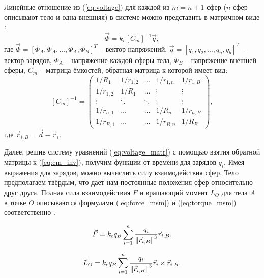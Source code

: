 Линейные отношение из (\ref{eq:voltage}) для каждой из $m = n + 1$ сфер ($n$ сфер описывают тело и одна внешняя) в системе можно представить в матричном виде \cite{msm}:
\begin{equation}
\label{eq:voltage_matr}
	\vec{\Phi} = k_c [C_m]^{-1} \vec{q},
\end{equation}
где $\vec{\Phi} = [\Phi_A, \Phi_A, \dots, \Phi_A, \Phi_B]^T$ – вектор напряжений, $\vec{q} = [q_1, q_2, \dots, q_n, q_b]^T$ – вектор зарядов, $\Phi_A$ – напряжение каждой сферы тела, $\Phi_B$ – напряжение внешней сферы, $C_m$ – матрица ёмкостей, обратная матрица к которой имеет вид:
\begin{equation}
\label{eq:cm_inv}
	[C_m]^{-1} = 
	\begin{pmatrix}
		1/R_1	&	1/r_{1,2}	&	\dots		&	1/r_{1,n}	&	1/r_{1,B} \\
		1/r_{1,2}	&	1/R_1	&	\dots		&	\vdots		&	\vdots \\
		\vdots		&	\ddots		&	\ddots	&	\vdots		&	\vdots \\
		1/r_{n,1}	&	\dots			&	\dots		&	1/R_n	&	1/r_{n,B} \\
		1/r_{B,1}	&	\dots			&	\dots		&	1/r_{B,n}	&	1/R_B
	\end{pmatrix},
\end{equation}
где $\vec{r}_{i,B} = \vec{d} - \vec{r}_i$.

Далее, решив систему уравнений (\ref{eq:voltage_matr}) с помощью взятия обратной матрицы к (\ref{eq:cm_inv}), получим функции от времени для зарядов $q_i$.
Имея выражения для зарядов, можно вычислить силу взаимодействия сфер.
Тело предполагаем твёрдым, что дает нам постоянные положения сфер относительно друг друга.
Полная сила взаимодействия $F$ и вращающий момент $L_O$ для тела $A$ в точке $O$ описываются формулами (\ref{eq:force_msm}) и (\ref{eq:torque_msm}) соответственно \cite{msm}.

\begin{equation}
\label{eq:force_msm}
	\vec{F} = k_c q_B \sum_{i=1}^n \frac{q_i}{\left\lVert\vec{r}_{i,B}\right\rVert^3}\vec{r}_{i,B}.
\end{equation}

\begin{equation}
\label{eq:torque_msm}
	\vec{L}_O = k_c q_B \sum_{i=1}^n \frac{q_i}{\left\lVert\vec{r}_{i,B}\right\rVert^3} \vec{r}_i \times \vec{r}_{i,B}.
\end{equation}
